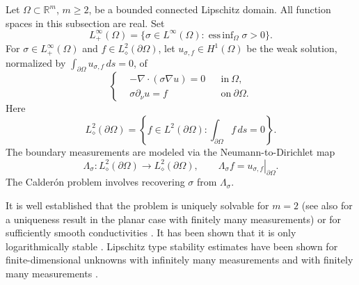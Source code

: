\documentclass[11pt,oneside]{amsart}
\theoremstyle{plain}
\theoremstyle{definition}
\theoremstyle{remark}
\newcommand{\RR}{\mathbb{R}}
\DeclareMathOperator*{\essinf}{ess\,inf}
\newcommand{\restr}[2]{\left.#1\right|_{#2}}
\begin{document}
Let $\Omega\subset\RR^m$, $m\geq2$, be a bounded connected Lipschitz domain. All function spaces in this subsection are real. Set
\[
    L^\infty_+(\Omega)
    =\{\sigma\in L^\infty(\Omega):\essinf_\Omega\sigma>0\}.
\]
For $\sigma\in L^\infty_+(\Omega)$ and $f\in L^2_\diamond(\partial\Omega)$, let $u_{\sigma,f}\in H^1(\Omega)$ be the weak solution, normalized by $\int_{\partial\Omega}u_{\sigma,f}\,ds=0$, of
\begin{equation}\label{eq:conductivity-equation}
  \left\{\begin{aligned}
    &-\nabla\cdot(\sigma\nabla u)=0&&\mathrm{in}~\Omega,\\
    &\sigma\partial_\nu u=f&&\mathrm{on}~\partial\Omega.
    \end{aligned}\right.  
\end{equation}
Here
\[
    L^2_\diamond(\partial\Omega)
    =\left\{f\in L^2(\partial\Omega):\int_{\partial\Omega}f\,ds=0\right\}.
\]
The boundary measurements are modeled via the Neumann-to-Dirichlet map
\begin{equation}\label{eq:ND-map}
    \Lambda_\sigma\colon L^2_\diamond(\partial\Omega)\to L^2_\diamond(\partial\Omega),\qquad \Lambda_\sigma f=\restr{u_{\sigma,f}}{\partial\Omega}.
\end{equation}
The Calder\'on problem involves recovering $\sigma$ from $\Lambda_\sigma$.

It is well established that the problem is uniquely solvable for $m=2$ \cite{nachman1996global, astala2006calderon} (see also \cite{seo1995uniqueness} for a uniqueness result in the planar case with finitely many measurements) or for sufficiently smooth conductivities \cite{sylvester1987global, haberman2013uniqueness,haberman2015uniqueness,caro2016global}. It has been shown that it is only logarithmically stable \cite{alessandrini1988stable,mandache2001exponential}. Lipschitz type stability estimates have been shown for finite-dimensional unknowns with infinitely many measurements \cite{alessandrini2005lipschitz, rondi2006remark,bacchelli2006lipschitz,beretta2011lipschitz,aspri2022lipschitz} and with finitely many measurements \cite{harrach2019uniqueness,alberti2022infinite,alberti2022inverse,hanke2024lipschitz}. 
\end{document}

